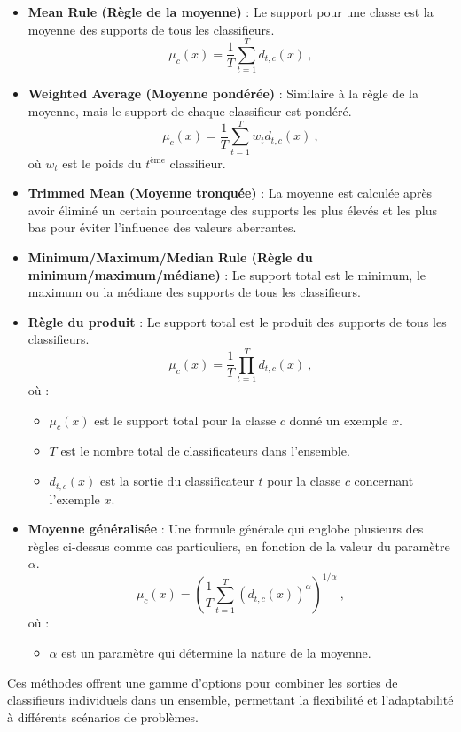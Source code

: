 \begin{itemize}
	\item \textbf{Mean Rule (Règle de la moyenne)} : Le support pour une classe est la moyenne des supports de tous les classifieurs.
	\[
	\mu_c(x) = \frac{1}{T} \sum_{t=1}^{T} d_{t,c}(x)~,
	\]
	
	\item \textbf{Weighted Average (Moyenne pondérée)} : Similaire à la règle de la moyenne, mais le support de chaque classifieur est pondéré.
	\[
	\mu_c(x) = \frac{1}{T} \sum_{t=1}^{T} w_t d_{t,c}(x)~,
	\]
	où $w_t$ est le poids du $t^{\text{ème}}$ classifieur.
	
	\item \textbf{Trimmed Mean (Moyenne tronquée)} : La moyenne est calculée après avoir éliminé un certain pourcentage des supports les plus élevés et les plus bas pour éviter l'influence des valeurs aberrantes.
	
	\item \textbf{Minimum/Maximum/Median Rule (Règle du minimum/maximum/médiane)} : Le support total est le minimum, le maximum ou la médiane des supports de tous les classifieurs.
	
	\item \textbf{Règle du produit} : Le support total est le produit des supports de tous les classifieurs.
	\[
	\mu_c(x) = \frac{1}{T} \prod_{t=1}^{T} d_{t,c}(x)~,
	\]
	où :
	\begin{itemize}
		\item \( \mu_c(x) \) est le support total pour la classe \( c \) donné un exemple \( x \).
		\item \( T \) est le nombre total de classificateurs dans l'ensemble.
		\item \( d_{t,c}(x) \) est la sortie du classificateur \( t \) pour la classe \( c \) concernant l'exemple \( x \).
	\end{itemize}
	
	\item \textbf{Moyenne généralisée} : Une formule générale qui englobe plusieurs des règles ci-dessus comme cas particuliers, en fonction de la valeur du paramètre \( \alpha \).
	\[
	\mu_c(x) = \left( \frac{1}{T} \sum_{t=1}^{T} (d_{t,c}(x))^\alpha \right)^{1/\alpha}~,
	\]
	où :
	\begin{itemize}
		\item \( \alpha \) est un paramètre qui détermine la nature de la moyenne.
	\end{itemize}
	
\end{itemize}
Ces méthodes offrent une gamme d'options pour combiner les sorties de classifieurs individuels dans un ensemble, permettant la flexibilité et l'adaptabilité à différents scénarios de problèmes.

